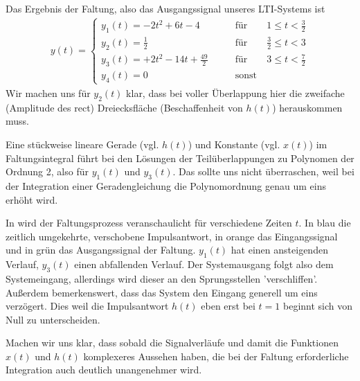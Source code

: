 \begin{Loesung}
Das Ergebnis der Faltung, also das Ausgangssignal unseres LTI-Systems ist
\begin{align}
y(t) =
\begin{cases}
  y_1(t) = -2 t^2 + 6 t - 4 &\qquad \mathrm{für} \qquad 1 \leq t < \frac{3}{2}\\
  y_2(t) = \frac{1}{2}  &\qquad \mathrm{für} \qquad \frac{3}{2} \leq t < 3\\
  y_3(t) = +2 t^2 - 14 t + \frac{49}{2} &\qquad \mathrm{für} \qquad 3 \leq t < \frac{7}{2}\\
  y_4(t)=0 &\qquad \mathrm{sonst}
\end{cases}
\end{align}
%
Wir machen uns für $y_2(t)$ klar, dass bei voller Überlappung hier die
zweifache (Amplitude des rect) Dreiecksfläche
(Beschaffenheit von $h(t)$) herauskommen muss.
%

Eine stückweise lineare Gerade (vgl. $h(t)$) und Konstante (vgl. $x(t)$)
im Faltungsintegral führt
bei den Lösungen der Teilüberlappungen zu Polynomen der Ordnung 2, also für
$y_1(t)$ und $y_3(t)$. Das sollte uns nicht überraschen,
weil bei der Integration einer Geradengleichung die Polynomordnung genau um eins
erhöht wird.
%

In  wird der Faltungsprozess veranschaulicht für verschiedene
Zeiten $t$. In blau die zeitlich umgekehrte, verschobene Impulsantwort, in
orange das Eingangssignal und in grün das Ausgangssignal der Faltung.
%
$y_1(t)$ hat einen ansteigenden Verlauf, $y_3(t)$ einen abfallenden Verlauf.
Der Systemausgang folgt also dem Systemeingang, allerdings wird dieser an den
Sprungsstellen 'verschliffen'.
%
Außerdem bemerkenswert, dass das System den Eingang generell um eins verzögert.
Dies weil die Impulsantwort $h(t)$ eben erst bei $t=1$ beginnt sich von Null
zu unterscheiden.
%

Machen wir uns klar, dass sobald die Signalverläufe und damit die Funktionen
$x(t)$ und $h(t)$ komplexeres Aussehen haben, die bei der Faltung erforderliche
Integration auch deutlich unangenehmer wird.

\end{Loesung}



